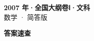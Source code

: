 \documentclass[zihao=-4, a4paper]{ctexart}
\begin{document}
\begin{center}
  {\Large\bfseries 2007 年·全国大纲卷Ⅰ·文科}\\[4pt]
  {\large 数学 · 简答版}
\end{center}
\medskip
{}

\clearpage
{}
\begin{center}{\Large\bfseries 答案速查}\end{center}
\medskip

\end{document}
